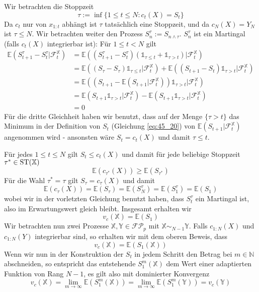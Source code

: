 \begin{example}
\begin{enumerate}
         Wir betrachten die Stoppzeit 
         $$\tau := \inf\{ 1\leq t\leq N: c_t(X) = S_t\}$$ 
         Da $c_t$ nur von $x_{1:t}$ abhängt ist $\tau$ tatsächlich eine Stoppzeit, und da $c_N(X)=Y_N$ ist $\tau \leq N$. Wir betrachten weiter den Prozess $S^\tau_n:=S_{n\wedge \tau}$. $S^\tau_n$ ist ein Martingal (falls $c_t(X)$ integrierbar ist): Für $1\leq t< N$ gilt 
         \begin{align*}
            \mathbb{E}(S^\tau_{t+1}-S^\tau_t \vert \mathcal{F}^\mathbb{X}_t) &= \mathbb{E}((S^\tau_{t+1} - S^\tau_t)(\mathds{1}_{\tau \leq t} + \mathds{1}_{\tau > t})\vert \mathcal{F}^\mathbb{X}_t) \\
            &= \mathbb{E}((S_\tau-S_\tau)\mathds{1}_{\tau\leq t} \vert \mathcal{F}^\mathbb{X}_t) + \mathbb{E}((S_{t+1} - S_t ) \mathds{1}_{\tau > t} \vert \mathcal{F}^\mathbb{X}_t) \\
            &= \mathbb{E}\left((S_{t+1} - \mathbb{E}(S_{t+1} \vert \mathcal{F}^\mathbb{X}_t))\mathds{1}_{\tau>t} \vert \mathcal{F}^\mathbb{X}_t\right) \\
            &= \mathbb{E}(S_{t+1}\mathds{1}_{\tau>t} \vert \mathcal{F}^\mathbb{X}_t) - \mathbb{E}(S_{t+1} \mathds{1}_{\tau>t} \vert \mathcal{F}^\mathbb{X}_t) \\
            &= 0
         \end{align*}
         Für die dritte Gleichheit haben wir benutzt, dass auf der Menge $\{\tau > t\}$ das Minimum in der Definition von $S_t$ (Gleichung \ref{eq:45_20}) von $\mathbb{E}(S_{t+1} \vert \mathcal{F}_t^\mathbb{X})$ angenommen wird - ansonsten wäre $S_t=c_t(X)$ und damit $\tau \leq t$.

        Für jedes $1 \leq t \leq N$ gilt $S_t \leq c_t(X)$ und damit für jede beliebige Stoppzeit $\tau^* \in \operatorname{ST}(\mathbb{X})$
        $$\mathbb{E}(c_{\tau^*}(X)) \geq \mathbb{E}(S_{\tau^*})$$
        Für die Wahl $\tau^*=\tau$ gilt $S_\tau = c_\tau(X)$ und damit
        $$\mathbb{E}(c_\tau(X)) = \mathbb{E}(S_\tau) = \mathbb{E}(S_N^\tau) = \mathbb{E}(S_1^\tau) = \mathbb{E}(S_1)$$
        wobei wir in der vorletzten Gleichung benutzt haben, dass $S_t^\tau$ ein Martingal ist, also im Erwartungswert gleich bleibt. Insgesamt erhalten wir 
        $$v_c(\mathbb{X}) = \mathbb{E}(S_1)$$
        Wir betrachten nun zwei Prozesse $\mathbb{X,Y} \in \mathcal{FP}_p$ mit $\mathbb{X} \sim_{N-1} \mathbb{Y}$. Falls $c_{1:N}(X)$ und $c_{1:N}(Y)$ integrierbar sind, so erhalten wir mit dem oberen Beweis, dass 
        $$v_c(\mathbb{X}) = \mathbb{E}(S_1(\mathbb{X}))$$
        Wenn wir nun in der Konstruktion der $S_t$ in jedem Schritt den Betrag bei $m \in \mathbb{N}$ abschneiden, so entspricht das entstehende $S_1^m(\mathbb{X})$ dem Wert einer adaptierten Funktion von Rang $N-1$, es gilt also mit dominierter Konvergenz
        $$v_c(\mathbb{X}) = \lim_{m\rightarrow \infty} \mathbb{E}(S_1^m(\mathbb{X})) = \lim_{m\rightarrow \infty} \mathbb{E}(S_1^m(\mathbb{Y})) = v_c(\mathbb{Y})$$

    \end{enumerate}

\end{example}
